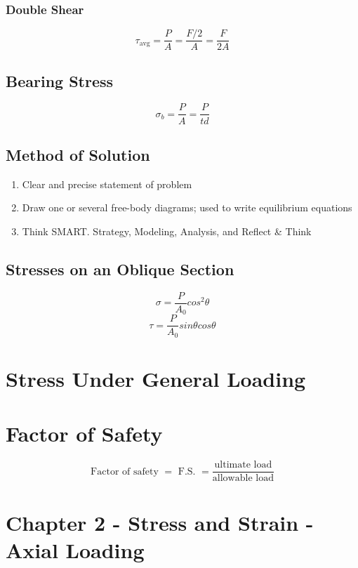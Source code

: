 \documentclass[10pt,landscape]{article}
\begin{document}
\begin{multicols}{3}
\subsubsection{Double Shear}
\begin{equation}
    \tau_{\text{avg}}=\frac{P}{A}=\frac{F/2}{A}=\frac{F}{2A}    
\end{equation}
\subsection{Bearing Stress}
\begin{equation}
    \sigma_b=\frac{P}{A}=\frac{P}{td}
\end{equation}
\subsection{Method of Solution}
\begin{enumerate}
  \item Clear and precise statement of problem
  \item Draw one or several free-body diagrams; used to write equilibrium equations
  \item Think SMART. Strategy, Modeling, Analysis, and Reflect \& Think
\end{enumerate}
\subsection{Stresses on an Oblique Section}
\begin{equation}
    \sigma=\frac{P}{A_0}cos^2\theta
\end{equation}
\begin{equation}
    \tau=\frac{P}{A_0}sin\theta cos\theta
\end{equation}
\section{Stress Under General Loading}
\section{Factor of Safety}
\begin{equation}
    \text{Factor of safety }=\text{ F.S. }=\frac{\text{ultimate load}}{\text{allowable load}}
\end{equation}

\section{Chapter 2 - Stress and Strain - Axial Loading}

\end{multicols}
\end{document}
